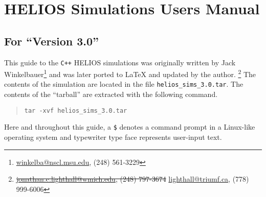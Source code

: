 \makeatletter%
\def\@xobeysp{ }%
\makeatother%
\renewcommand{\arraystretch}{1} %
\sloppy%
\chapter[Simulations Manual]{HELIOS Simulations Users Manual}
\label{sim_man}
\newcommand{\subtitle}[1]{\vspace*{-2.0\baselineskip}%
	\noindent\large\textbf{#1}%
	\normalsize\vspace{1.0\baselineskip}} 
	
	\newcommand{\subtitleb}[1]{\vspace*{-2.5\baselineskip}%
	\section*{#1}
	\normalsize\vspace{0.5\baselineskip}}
\subtitleb{For ``Version 3.0''}


This guide to the \texttt{C++} HELIOS simulations was originally written by Jack Winkelbauer\footnote{ \href{mailto:winkelba@nscl.msu.edu}{winkelba@nscl.msu.edu}, (248) 561-3229} and was later ported to \LaTeX{} and updated by the author.%
\footnote{\sout{\href{mailto:jonathan.c.lighthall@wmich.edu}{jonathan.c.lighthall@wmich.edu}, (248) 797-3674} \href{mailto:lighthall@triumf.ca}{lighthall@triumf.ca}, (778) 999-6006} The contents of the simulation are located in the file \texttt{helios\_sims\_3.0.tar}.  The contents of the ``tarball'' are extracted with the following command.
\renewcommand{\FancyVerbFormatLine}[1]{{{\color{green} \$ }}#1}%
\begin{quote}
\begin{Verbatim}
tar -xvf helios_sims_3.0.tar
\end{Verbatim}
\end{quote}
Here and throughout this guide, a {\color{green}\texttt{\$}} denotes a command prompt in a Linux-like operating system and typewriter type face represents user-input text.

